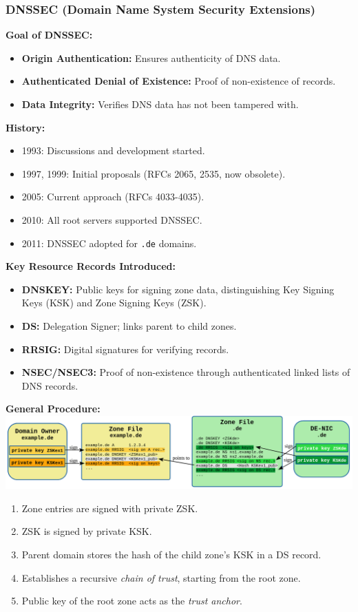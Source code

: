 \subsubsection{DNSSEC (Domain Name System Security Extensions)}
\textbf{Goal of DNSSEC:}
\begin{itemize}
    \item \textbf{Origin Authentication:} Ensures authenticity of DNS data.
    \item \textbf{Authenticated Denial of Existence:} Proof of non-existence of records.
    \item \textbf{Data Integrity:} Verifies DNS data has not been tampered with.
\end{itemize}
\textbf{History:}
\begin{itemize}
    \item 1993: Discussions and development started.
    \item 1997, 1999: Initial proposals (RFCs 2065, 2535, now obsolete).
    \item 2005: Current approach (RFCs 4033-4035).
    \item 2010: All root servers supported DNSSEC.
    \item 2011: DNSSEC adopted for \texttt{.de} domains.
\end{itemize}
\textbf{Key Resource Records Introduced:}
\begin{itemize}
    \item \textbf{DNSKEY:} Public keys for signing zone data, distinguishing Key Signing Keys (KSK) and Zone Signing Keys (ZSK).
    \item \textbf{DS:} Delegation Signer; links parent to child zones.
    \item \textbf{RRSIG:} Digital signatures for verifying records.
    \item \textbf{NSEC/NSEC3:} Proof of non-existence through authenticated linked lists of DNS records.
\end{itemize}
\textbf{General Procedure:}\\
\includegraphics[width=\columnwidth]{Resources/dnssec.png}
\begin{enumerate}
    \item Zone entries are signed with private ZSK.
    \item ZSK is signed by private KSK.
    \item Parent domain stores the hash of the child zone’s KSK in a DS record.
    \item Establishes a recursive \textit{chain of trust}, starting from the root zone.
    \item Public key of the root zone acts as the \textit{trust anchor}.
\end{enumerate}
